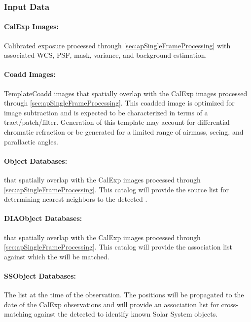 \subsubsection{Input Data}
\label{sec:apADInput}

\paragraph*{CalExp Images:} Calibrated exposure processed through \ref{sec:apSingleFrameProcessing} with associated WCS, PSF, mask, variance, and background estimation.

\paragraph*{Coadd Images:} TemplateCoadd images that spatially overlap with the CalExp images processed through \ref{sec:apSingleFrameProcessing}. This coadded image is optimized for image subtraction and is expected to be characterized in terms of a tract/patch/filter. Generation of this template may account for differential chromatic refraction or be generated for a limited range of airmass, seeing, and parallactic angles.

\paragraph*{Object Databases:} \Objects that spatially overlap with the CalExp images processed through \ref{sec:apSingleFrameProcessing}. This \Object catalog will provide the source list for determining nearest neighbors to the detected \DIASources. 


\paragraph*{DIAObject Databases:} \DIAObjects that spatially overlap with the CalExp images processed through \ref{sec:apSingleFrameProcessing}. This \DIAObject catalog will provide the association  list against which the \DIASources will be matched. 

\paragraph*{SSObject Databases:} The \SSObject list at the time of the observation. The \SSObject positions will be propagated to the date of the CalExp observations and will provide an association  list for cross-matching against the detected \DIASources to identify known Solar System objects.

